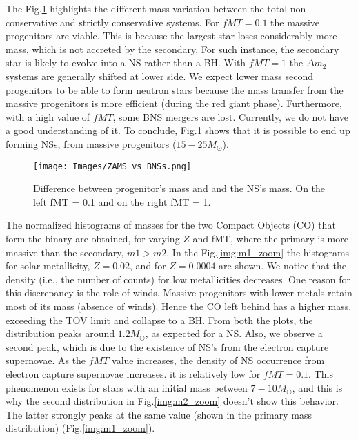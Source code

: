 \documentclass[preprint,12pt]{elsarticle}
\begin{document}
The Fig.\ref{img:ZAMS_vs_NS} highlights the different mass variation between the total non-conservative and strictly conservative systems. 
For $fMT = 0.1$ the massive progenitors are viable. This is because the largest star loses considerably more mass, which is not accreted by the secondary. For such instance, the secondary star is likely to evolve into a NS rather than a BH.
With $fMT = 1$ the $\Delta m_2$ systems are generally shifted at lower side. We expect lower mass second progenitors to be able to form neutron stars because the mass transfer from the massive progenitors is more efficient (during the red giant phase). Furthermore, with a high value of $fMT$, some BNS mergers are lost. Currently, we do not have a good understanding of it. To conclude, Fig.\ref{img:ZAMS_vs_NS} shows that it is possible to end up forming NSs, from massive progenitors ($15 - 25M_{\odot}$).

\begin{figure}[hb]
    \centering
    \texttt{[image: Images/ZAMS\_vs\_BNSs.png]}
    \caption{Difference between progenitor's mass and and the NS's mass. On the left fMT = 0.1 and on the right fMT = 1.}
    \label{img:ZAMS_vs_NS}
\end{figure}

The normalized histograms of masses for the two Compact Objects (CO) that form the binary are obtained, for varying $Z$ and fMT, where the primary is more massive than the secondary, $m1 > m2$. In the Fig.\ref{img:m1_zoom} the histograms for solar metallicity, $Z=0.02$, and for $Z=0.0004$ are shown. We notice that the density (i.e., the number of counts) for low metallicities decreases. One reason for this discrepancy is the role of winds. Massive progenitors with lower metals retain most of its mass (absence of winds). Hence the CO left behind has a higher mass, exceeding the TOV limit\citep{Tolman:1939, Volkoff:1939} and collapse to a BH. From both the plots, the distribution peaks around $1.2 M_{\odot}$, as expected for a NS. Also, we observe a second peak, which is due to the existence of NS's from the electron capture supernovae. As the $fMT$ value increases, the density of NS occurrence from electron capture supernovae increases. it is relatively low for $fMT=0.1$. This phenomenon exists for stars with an initial mass between $7-10M_{\odot}$, and this is why the second distribution in Fig.\ref{img:m2_zoom} doesn't show this behavior. The latter strongly peaks at the same value (shown in the primary mass distribution) (Fig.\ref{img:m1_zoom}). 
\end{document}
